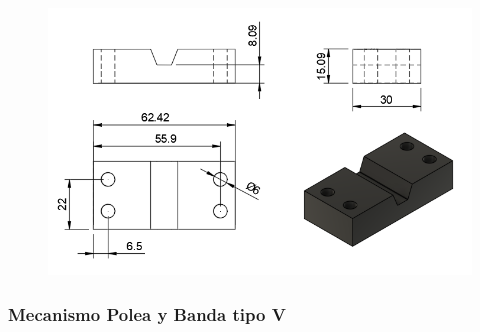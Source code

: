 \begin{enumerate}
\begin{figure}[h]
\begin{minipage}{0.45\textwidth}
                \caption{}
                \label{fig:imagen1}
            \end{minipage}%
            \hfill
            \begin{minipage}{0.45\textwidth}
                \centering
                \includegraphics[width=\textwidth]{PLANOS/PLANO_SUJ_BANDA_2.png}
                \caption{}
                \label{fig:imagen2}
            \end{minipage}%
            \hfill
            \end{figure}
    \end{enumerate}

\subsubsection{Mecanismo Polea y Banda tipo V}

